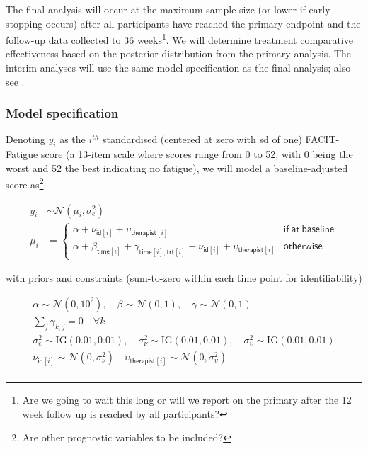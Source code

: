 \documentclass[
]{article}
\begin{document}
The final analysis will occur at the maximum sample size (or lower if early stopping occurs) after all participants have reached the primary endpoint and the follow-up data collected to 36 weeks\footnote{Are we going to wait this long or will we report on the primary after the 12 week follow up is reached by all participants?}.
We will determine treatment comparative effectiveness based on the posterior distribution from the primary analysis.
The interim analyses will use the same model specification as the final analysis; also see .

\hypertarget{model-specification}{%
  \subsubsection{Model specification}\label{model-specification}}

Denoting $y_{i}$ as the $i^{th}$ standardised (centered at zero with sd of one) FACIT-Fatigue score (a 13-item scale where scores range from 0 to 52, with 0 being the worst and 52 the best indicating no fatigue), we will model a baseline-adjusted score as\footnote{Are other prognostic variables to be included?}

\[
  \begin{aligned}
    y_{i} & \sim \mathcal{N}(\mu_{i}, \sigma_e^2) \\
    \mu_i & = \begin{cases}
      \alpha + \nu_{\mathsf{id}[i]} + \upsilon_{\mathsf{therapist}[i]}                                                                        & \mathsf{if \ at \ baseline} \\
      \alpha + \beta_{\mathsf{time}[i]} + \gamma_{\mathsf{time}[i],\mathsf{trt}[i]} + \nu_{\mathsf{id}[i]} + \upsilon_{\mathsf{therapist}[i]} & \mathsf{otherwise}
    \end{cases}
  \end{aligned}
\]

with priors and constraints (sum-to-zero within each time point for identifiability)

\begin{gather*}
  \alpha \sim \mathcal{N}(0, 10^2), \quad \beta \sim \mathcal{N}(0, 1), \quad \gamma \sim \mathcal{N}(0, 1) \\
  \sum_j \gamma_{k,j} = 0 \quad \forall k  \\
  \sigma_e^2 \sim \text{IG}(0.01, 0.01), \quad \sigma_\nu^2 \sim \text{IG}(0.01, 0.01), \quad \sigma_\upsilon^2 \sim \text{IG}(0.01, 0.01) \\
  \nu_{\mathsf{id}[i]} \sim \mathcal{N}(0, \sigma_\nu^2) \quad \upsilon_{\mathsf{therapist}[i]} \sim \mathcal{N}(0, \sigma_\upsilon^2) \\
\end{gather*}
\end{document}
